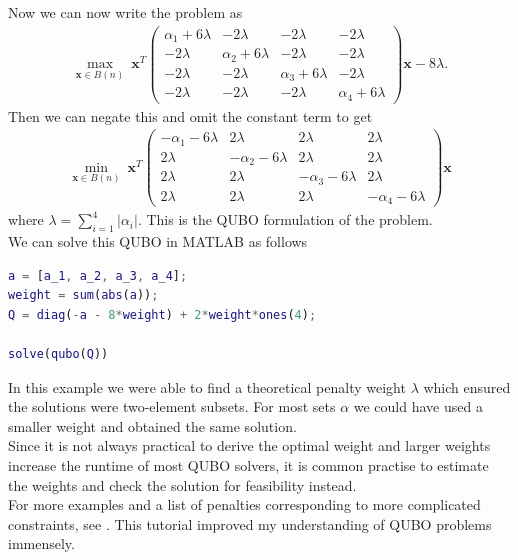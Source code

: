 \documentclass{article}
\begin{document}
\noindent Now we can now write the problem as
\begin{align*}
	\max_{\mathbf{x} \in B(n)} \: \mathbf{x}^T \begin{pmatrix}
        \alpha_1 + 6\lambda & -2\lambda & -2\lambda & -2\lambda \\
        -2\lambda  & \alpha_2 + 6\lambda  & -2\lambda & -2\lambda\\
        -2\lambda & -2\lambda & \alpha_3 + 6\lambda & -2\lambda \\
        -2\lambda & -2\lambda & -2\lambda & \alpha_4 + 6\lambda
	\end{pmatrix} \mathbf{x} - 8\lambda.
\end{align*}
Then we can negate this and omit the constant term to get
\begin{align*}
    \min_{\mathbf{x} \in B(n)} \: \mathbf{x}^T \begin{pmatrix}
        -\alpha_1 - 6\lambda & 2\lambda & 2\lambda & 2\lambda \\
        2\lambda  & -\alpha_2 - 6\lambda & 2\lambda & 2\lambda\\
        2\lambda & 2\lambda & -\alpha_3 - 6\lambda & 2\lambda \\
        2\lambda & 2\lambda & 2\lambda & -\alpha_4 - 6\lambda
	\end{pmatrix} \mathbf{x}
\end{align*}
where \(\lambda = \sum_{i=1}^4 |\alpha_i|\). This is the QUBO formulation of the problem.\\

\noindent We can solve this QUBO in MATLAB as follows
\begin{lstlisting}[language=MATLAB]
a = [a_1, a_2, a_3, a_4];
weight = sum(abs(a));
Q = diag(-a - 8*weight) + 2*weight*ones(4);

solve(qubo(Q))
\end{lstlisting} 

\noindent In this example we were able to find a theoretical penalty weight \(\lambda\) which ensured the solutions were two-element subsets. For most sets \(\alpha\) we could have used a smaller weight and obtained the same solution.\\
Since it is not always practical to derive the optimal weight and larger weights increase the runtime of most QUBO solvers, it is common practise to estimate the weights and check the solution for feasibility instead. \\

\noindent For more examples and a list of penalties corresponding to more complicated constraints, see \cite[p.~10]{tutorialQUBO}. This tutorial improved my understanding of QUBO problems immensely.\\
\end{document}
